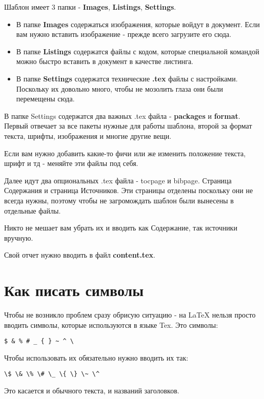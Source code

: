 Шаблон имеет 3 папки - \textbf{Images}, \textbf{Listings}, \textbf{Settings}. 
\begin{itemize}
\item В папке \textbf{Images} содержаться изображения, которые войдут в документ. Если вам нужно вставить изображение - прежде всего загрузите его сюда.
\item В папке \textbf{Listings} содержатся файлы с кодом, которые специальной командой можно быстро вставить в документ в качестве листинга.
\item В папке \textbf{Settings} содержатся технические \textbf{.tex} файлы с настройками. Поскольку их довольно много, чтобы не мозолить глаза они были перемещены сюда.
\end{itemize}
В папке Settings содержатся два важных .tex файла - \textbf{packages }и \textbf{format}. Первый отвечает за все пакеты нужные для работы шаблона, второй за формат текста, шрифты, изображения и многие другие вещи.

Если вам нужно добавить какие-то фичи или же изменить положение текста, шрифт и тд - меняйте эти файлы под себя.

Далее идут два опциональных .tex файла - tocpage и bibpage. Страница Содержания и страница Источников. Эти страницы отделены поскольку они не всегда нужны, поэтому чтобы не загромождать шаблон были вынесены в отдельные файлы.

Никто не мешает вам убрать их и вводить как Содержание, так источники вручную.

Свой отчет нужно вводить в файл \textbf{content.tex}.


\section{Как писать символы}
Чтобы не возникло проблем сразу обрисую ситуацию - на LaTeX нельзя просто вводить символы, которые используются в языке Tex. Это символы:

\begin{verbatim}
$ & % # _ { } ~ ^ \
\end{verbatim}
Чтобы использовать их обязательно нужно вводить их так:
\begin{verbatim}
\$ \& \% \# \_ \{ \} \~ \^
\end{verbatim}
Это касается и обычного текста, и названий заголовков.








